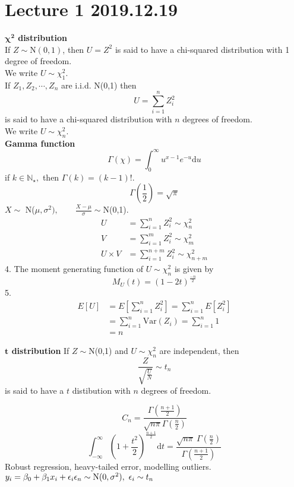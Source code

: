 \documentclass{article}
\let\ddd\cdots
\theoremstyle{definition}
\theoremstyle{remark}
\theoremstyle{example}
\renewcommand{\d}{\mathrm{d}}
\newcommand{\Var}[1]{\mathrm{Var}\left(#1\right)}
\begin{document}
	\section*{Lecture 1 2019.12.19}
	\textbf{$\mathbf{\chi^2}$ distribution}\\
	If $Z \sim \mathrm{N}(0,1)$, then $U=Z^2$ is said to have a chi-squared distribution with 1 degree of freedom.\\
	We write $U \sim \chi^2_1$.\\
	If $Z_1,Z_2,\ddd,Z_n$ are i.i.d. N(0,1) then \[U=\sum_{i=1}^{n} Z^2_i\] is said to have a chi-squared distribution with $n$ degrees of freedom.\\
	We write $U \sim \chi_n^2$.\\
	\textbf{Gamma function}\\
	\[\Gamma(\chi) = \int_{0}^{\infty} u^{x-1}e^{-u} \d u \] if $k \in \mathbb{N}_\star,$ then $\Gamma(k)=(k-1)!$.\\
	\[ \Gamma\left(\frac12\right)=\sqrt{\pi} \]
	$X \sim$ N($\mu,\sigma^2),\qquad \frac{X-\mu}{\sigma}\sim$N(0,1).
	\begin{align*}
		U&=\sum_{i=1}^{n}Z_i^2 \sim \chi^2_n\\
		V&=\sum_{i=1}^{m}Z_i^2 \sim \chi^2_m\\
		U \times V &= \sum_{i=1}^{n+m}Z_i^2 \sim \chi^2_{n+m}
	\end{align*}
	4. The moment generating function of $U\sim \chi_n^2$ is given by \[M_U(t)=(1-2t)^{\frac{-n}{2}}\]
	5. \begin{align*}
		E[U]&=E\left[\sum_{i=1}^{n}Z_i^2\right]=\sum_{i=1}^{n}E[Z_i^2]\\
		&=\sum_{i=1}^{n}\Var{Z_i}=\sum_{i=1}^{n}1\\
		&= n
	\end{align*}
	
	\textbf{$\mathbf{t}$ distribution}
	If $Z \sim$N(0,1) and $U\sim \chi^2_n$ are independent, then \[\frac{Z}{\sqrt{\frac{U}{N}}} \sim t_n\] is said to have a $t$ distibution with $n$ degrees of freedom.
	
	\[C_n=\frac{\Gamma\left(\frac{n+1}{2}\right)}{\sqrt{n \pi } \Gamma \left(\frac{n}{2}\right)}\]
	\[\int_{-\infty}^{\infty} \left(1+\frac{t^2}{2}\right)^{\frac{n+1}{2}} \d t = \frac{\sqrt{n \pi}\ \Gamma \left(\frac{n}{2}\right)}{\Gamma \left(\frac{n+1}{2}\right)} \]
	Robust regression, heavy-tailed error, modelling outliers.\\
	$y_i=\beta_0+\beta_1x_i+\epsilon_i\\
	\epsilon_n \sim \mathrm{N}(0,\sigma^2),\  \epsilon_i \sim t_n$\\
	
\end{document}
